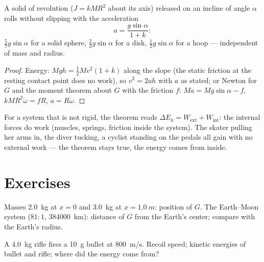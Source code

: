 \begin{proposition}\label{prop:b1:systems-of-points:rollingincline}
A solid of revolution ($J = kMR^2$ about its axis) released on an
incline of angle $\alpha$ rolls without slipping with the acceleration
\[
a = \frac{g\sin\alpha}{1 + k} :
\]
$\tfrac57 g\sin\alpha$ for a solid sphere, $\tfrac23 g\sin\alpha$ for a disk,
$\tfrac12 g\sin\alpha$ for a hoop --- independent of mass and radius.
\end{proposition}

\begin{proof}
Energy: $Mgh = \tfrac12 Mv^2(1 + k)$ along the slope (the static friction
at the resting contact point does no work), so $v^2 = 2ah$ with $a$ as
stated; or Newton for $G$ and the moment theorem about $G$ with the
friction $f$: $Ma = Mg\sin\alpha - f$, $kMR^2\dot\omega = fR$, $a = R\dot\omega$.
\end{proof}

\begin{remark}\label{rem:b1:systems-of-points:deformable}
For a system that is not rigid, the  theorem reads
$\Delta E_k = W_{\mathrm{ext}} + W_{\mathrm{int}}$: the internal forces do
work (muscles, springs, friction inside the system). The skater pulling
her arms in, the diver tucking, a cyclist standing on the pedals all
gain  with no external work --- the 
theorem stays true, the energy comes from inside.
\end{remark}

\section{Exercises}

\begin{exercise}[$\star$]\label{exo:b1:systems-of-points:1}
Masses \qty{2.0}{kg} at $x = 0$ and \qty{3.0}{kg} at $x = \qty{1.0}{m}$:
position of $G$. The Earth--Moon system ($81:1$, \qty{384000}{km}):
distance of $G$ from the Earth's center; compare with the Earth's
radius.
\end{exercise}

\begin{exercise}[$\star$]\label{exo:b1:systems-of-points:2}
A \qty{4.0}{kg} rifle fires a \qty{10}{g} bullet at \qty{800}{m/s}.
Recoil speed; kinetic energies of bullet and rifle; where did the energy
come from?
\end{exercise}

